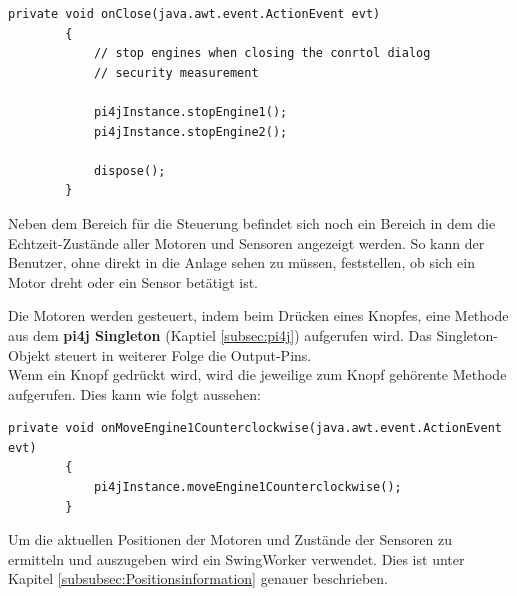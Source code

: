 \newpage

\begin{lstlisting}[style=JavaStyle, caption=Motoren stoppen und Fenster schließen]
	private void onClose(java.awt.event.ActionEvent evt)                                
    	{                                 
       		// stop engines when closing the conrtol dialog
       		// security measurement
       		
        	pi4jInstance.stopEngine1();
        	pi4jInstance.stopEngine2();
        
        	dispose();
    	} 
\end{lstlisting}

\vspace{10pt}

Neben dem Bereich für die Steuerung befindet sich noch ein Bereich in dem die Echtzeit-Zustände aller Motoren und Sensoren angezeigt werden. So kann der Benutzer, ohne direkt in die Anlage sehen zu müssen, feststellen, ob sich ein Motor dreht oder ein Sensor betätigt ist.

\vspace{10pt}

Die Motoren werden gesteuert, indem beim Drücken eines Knopfes, eine Methode aus dem \textbf{\ac{pi4j} Singleton} (Kaptiel \ref{subsec:pi4j}) aufgerufen wird. Das Singleton-Objekt steuert in weiterer Folge die Output-Pins.
\\ Wenn ein Knopf gedrückt wird, wird die jeweilige zum Knopf gehörente Methode aufgerufen. Dies kann wie folgt aussehen:
\begin{lstlisting}[style=JavaStyle, caption=Motoren drehen] 
	private void onMoveEngine1Counterclockwise(java.awt.event.ActionEvent evt)                                               
    	{                                                   
        	pi4jInstance.moveEngine1Counterclockwise();
    	}  
\end{lstlisting}

\vspace{10pt}

Um die aktuellen Positionen der Motoren und Zustände der Sensoren zu ermitteln und auszugeben wird ein SwingWorker verwendet. Dies ist unter Kapitel \ref{subsubsec:Positionsinformation} genauer beschrieben.

\newpage

